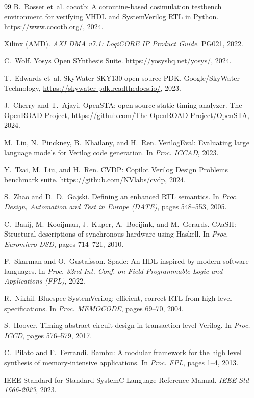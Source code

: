 \documentclass[manuscript]{acmart}
\begin{document}
\begin{thebibliography}{99}
B.~Rosser et~al.
cocotb: A coroutine-based cosimulation testbench environment for verifying VHDL and SystemVerilog RTL in Python.
\url{https://www.cocotb.org/}, 2024.

Xilinx (AMD).
\textit{AXI DMA v7.1: LogiCORE IP Product Guide}.
PG021, 2022.

C.~Wolf.
Yosys Open SYnthesis Suite.
\url{https://yosyshq.net/yosys/}, 2024.

T.~Edwards et~al.
SkyWater SKY130 open-source PDK.
Google/SkyWater Technology, \url{https://skywater-pdk.readthedocs.io/}, 2023.

J.~Cherry and T.~Ajayi.
OpenSTA: open-source static timing analyzer.
The OpenROAD Project, \url{https://github.com/The-OpenROAD-Project/OpenSTA}, 2024.

M.~Liu, N.~Pinckney, B.~Khailany, and H.~Ren.
VerilogEval: Evaluating large language models for Verilog code generation.
In \textit{Proc. ICCAD}, 2023.

Y.~Tsai, M.~Liu, and H.~Ren.
CVDP: Copilot Verilog Design Problems benchmark suite.
\url{https://github.com/NVlabs/cvdp}, 2024.

S.~Zhao and D.~D.~Gajski.
Defining an enhanced RTL semantics.
In \textit{Proc. Design, Automation and Test in Europe (DATE)}, pages 548--553, 2005.

C.~Baaij, M.~Kooijman, J.~Kuper, A.~Boeijink, and M.~Gerards.
C$\lambda$aSH: Structural descriptions of synchronous hardware using Haskell.
In \textit{Proc. Euromicro DSD}, pages 714--721, 2010.

F.~Skarman and O.~Gustafsson.
Spade: An HDL inspired by modern software languages.
In \textit{Proc. 32nd Int. Conf. on Field-Programmable Logic and Applications (FPL)}, 2022.

R.~Nikhil.
Bluespec SystemVerilog: efficient, correct RTL from high-level specifications.
In \textit{Proc. MEMOCODE}, pages 69--70, 2004.

S.~Hoover.
Timing-abstract circuit design in transaction-level Verilog.
In \textit{Proc. ICCD}, pages 576--579, 2017.

C.~Pilato and F.~Ferrandi.
Bambu: A modular framework for the high level synthesis of memory-intensive applications.
In \textit{Proc. FPL}, pages 1--4, 2013.

IEEE Standard for Standard SystemC Language Reference Manual.
\textit{IEEE Std 1666-2023}, 2023.


\end{thebibliography}
\end{document}

